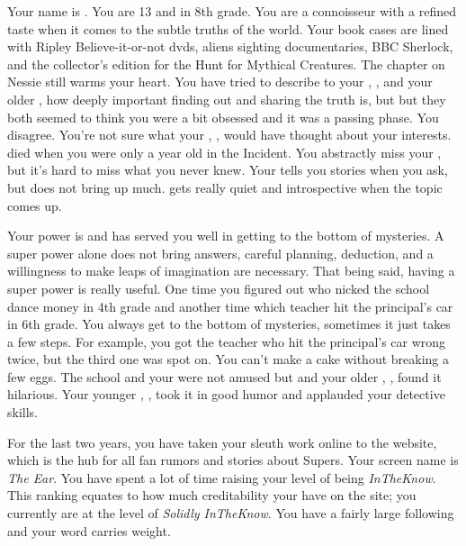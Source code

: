 \documentclass[char]{LRSguildcamp1}
\begin{document}
\name{\cTween{}}


Your name is \cTween{\intro}. You are 13 and in 8th grade. You are a connoisseur with a refined taste when it comes to the subtle truths of the world. Your book cases are lined with Ripley Believe-it-or-not dvds, aliens sighting documentaries,  BBC Sherlock, and the collector's edition for the Hunt for Mythical Creatures. The chapter on Nessie still warms your heart. You have tried to describe to your \cArchitect{\parent}, \cArchitect{}, and your older \cTeen{\sibling}, \cTeen{} how deeply important finding out and sharing the truth is, but but they both seemed to think you were a bit obsessed and it was a passing phase.
You disagree. You're not sure what your \cAS{\parent}, \cAS{}, would have thought about your interests. \cAS{\They} died when you were only a year old in the \pCityO{} Incident. You abstractly miss your \cAS{\parent}, but it's hard to miss what you never knew. Your \cArchitect{\parent} tells you stories when you ask, but does not bring \cAS{\them} up much. \cTeen{} gets really quiet and introspective when the topic comes up. 

Your power is \cTween{\MYsuperpower} and has served you well in getting to the bottom of mysteries. A super power alone does not bring answers, careful planning, deduction, and a willingness to make leaps of imagination are necessary. That being said, having a super power is really useful. One time you figured out who nicked the school dance money in 4th grade and another time which teacher hit the principal's car in 6th grade. You always get to the bottom of mysteries, sometimes it just takes a few steps. For example, you got the teacher who hit the principal's car wrong twice, but the third one was spot on. You can't make a cake without breaking a few eggs. The school and your \cArchitect{\parent} were not amused but \cGrandma{} and your older \cOldest{\uncle}, \cOldest{}, found it hilarious. Your younger \cYoungest{\uncle}, \cYoungest{}, took it in good humor and applauded your detective skills.

For the last two years, you have taken your sleuth work online to the \pTweenwebsite{} website, which is the hub for all fan rumors and stories about Supers. Your screen name is \textit{The Ear}. You have spent a lot of time raising your level of being \textsl{InTheKnow}. This ranking equates to how much creditability your have on the site; you currently are at the level of \textsl{Solidly InTheKnow}. You have a fairly large following and your word carries weight. 
\end{document}
